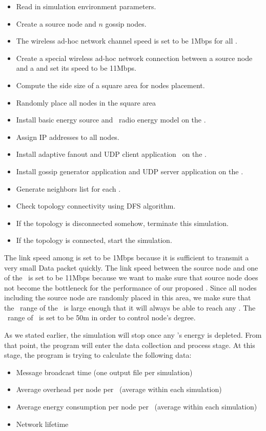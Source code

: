 \begin{itemize}
	\item Read in simulation environment parameters. 
	\item Create a source node and $n$ gossip nodes.
	\item The wireless ad-hoc network channel speed is set to be 1Mbps for all \gns.
	\item Create a special wireless ad-hoc network connection between a source node and a \gn and set its speed to be 11Mbps.
	\item Compute the side size of a square area for nodes placement.
	\item Randomly place all nodes in the square area
	\item Install basic energy source and \wf ~radio energy model on the \gns.
	\item Assign IP addresses to all nodes.
	\item Install adaptive fanout \gp and UDP client application ~on the \gns.
	\item Install gossip generator application and UDP server application on the \sn.
	\item Generate neighbors list for each \gn.
	\item Check topology connectivity using DFS algorithm.
	\item If the topology is disconnected somehow, terminate this simulation.
	\item If the topology is connected, start the simulation.
\end{itemize}

The link speed among \gns is set to be 1Mbps because it is sufficient to transmit a very small Data packet quickly. The link speed between the source node and one of the \gn ~is set to be 11Mbps because we want to make sure that source node does not become the bottleneck for the performance of our proposed \gp. Since all nodes including the source node are randomly placed in this area, we make sure that the \wf ~range of the \sn ~is large enough that it will always be able to reach any \gns. The \wf ~range of \gns ~is set to be 50m in order to control node's degree. 

As we stated earlier, the simulation will stop once any \gn's energy is depleted. From that point, the program will enter the data collection and process stage. At this stage, the program is trying to calculate the following data:

\begin{itemize}
	\item Message broadcast time (one output file per simulation)
	\item Average overhead per node per \msg ~(average within each simulation)
	\item Average energy consumption per node per \msg ~(average within each simulation)
	\item Network lifetime
\end{itemize}

